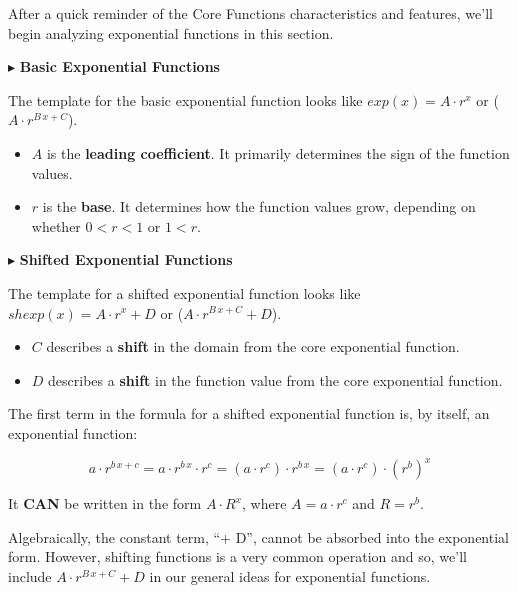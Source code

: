 \documentclass{ximera}
\begin{document}
After a quick reminder of the Core Functions characteristics and features, we'll begin analyzing exponential functions in this section.   





$\blacktriangleright$ \textbf{\textcolor{blue!55!black}{Basic Exponential Functions}} 


The template for the basic exponential function looks like \textbf{\textcolor{blue!55!black}{$exp(x) = A \cdot r^x$}} or  (\textbf{\textcolor{blue!55!black}{$A \cdot r^{B \, x + C}$}}). 

\begin{itemize}
\item $A$ is the \textbf{\textcolor{purple!85!blue}{leading coefficient}}.  It primarily determines the sign of the function values.
\item $r$ is the \textbf{\textcolor{purple!85!blue}{base}}. It determines how the function values grow, depending on whether $0 < r < 1$ or $1 < r$.
\end{itemize}





$\blacktriangleright$ \textbf{\textcolor{blue!55!black}{Shifted Exponential Functions}}   

The template for a shifted exponential function looks like \textbf{\textcolor{blue!55!black}{$shexp(x) = A \cdot r^x + D$}}  or  (\textbf{\textcolor{blue!55!black}{$A \cdot r^{B \, x + C} + D$}}). 

\begin{itemize}
\item $C$ describes a \textbf{\textcolor{purple!85!blue}{shift}} in the domain from the core exponential function.  
\item $D$ describes a \textbf{\textcolor{purple!85!blue}{shift}} in the function value from the core exponential function. 
\end{itemize}

The first term in the formula for a shifted exponential function is, by itself, an exponential function:

\[
a \cdot r^{b \, x + c} = a \cdot r^{b \, x} \cdot  r^c = (a \cdot r^c) \cdot r^{b \, x} = (a \cdot r^c) \cdot (r^b)^x 
\]

It \textbf{\textcolor{purple!85!blue}{CAN}} be written in the form $A \cdot R^x$, where $A = a \cdot r^c$ and $R = r^b$.


Algebraically, the constant term, ``+ D'', cannot be absorbed into the exponential form.  However, shifting functions is a very common operation and so, we'll include $A \cdot r^{B \, x + C} + D$ in our general ideas for exponential functions.
\end{document}
